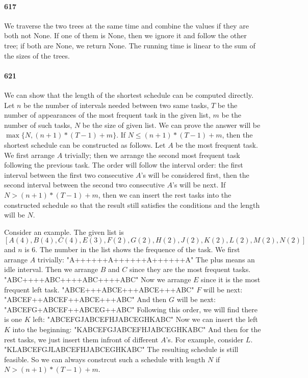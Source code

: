 \documentclass[11pt]{article}
\begin{document}
\begin{itemize}
{\paragraph{617}
We traverse the two trees at the same time and combine the values if they are both not None. If one of them is None, then we 
ignore it and follow the other tree; if both are None, we return None.
The running time is linear to the sum of the sizes of the trees.

\paragraph{621}
We can show that the length of the shortest schedule can be computed directly. Let $n$ be the number of intervals needed 
between two same tasks, $T$ be the number of appearances of the most frequent task in the given list, $m$ be the number of 
such tasks, $N$ be the size of given list. We can prove the answer will be $\max \{ N, (n+1)*(T-1)+m \}$.
If $N \le (n+1)*(T-1)+m$, then the shortest schedule can be constructed as follows.
Let $A$ be the most frequent task. We first arrange $A$ trivially; then we arrange the second most frequent task 
following the previous task. The order will follow the interval order: the first interval between the first two consecutive 
$A$'s will be considered first, then the second interval between the second two consecutive $A$'s will be next.
If $N > (n+1)*(T-1) +m$, then we can insert the rest tasks into the constructed schedule so that the result still satisfies the
conditions and the length will be $N$.

Consider an example. The given list is $[A(4), B(4), C(4), E(3), F(2), G(2), H(2), J(2), K(2), L(2), M(2), N(2)]$ and $n$ is 6.
The number in the list shows the frequence of the task. We first arrange $A$ trivially:
"A++++++A++++++A++++++A"
The plus means an idle interval. 
Then we arrange $B$ and $C$ since they are the most frequent tasks.
"ABC++++ABC++++ABC++++ABC"
Now we arrange $E$ since it is the most frequent left task.
"ABCE+++ABCE+++ABCE+++ABC"
$F$ will be next:
"ABCEF++ABCEF++ABCE+++ABC"
And then $G$ will be next:
"ABCEFG+ABCEF++ABCEG++ABC"
Following this order, we will find there is one $K$ left:
"ABCEFGJABCEFHJABCEGHKABC"
Now we can insert the left $K$ into the beginning:
"KABCEFGJABCEFHJABCEGHKABC"
And then for the rest tasks, we just insert them infront of different $A$'s. For example, consider $L$.
"KLABCEFGJLABCEFHJABCEGHKABC"
The resulting schedule is still feasible.
So we can always constrcut such a schedule with length $N$ if $N > (n+1)*(T-1) + m$.

}
\end{itemize}
\end{document}
